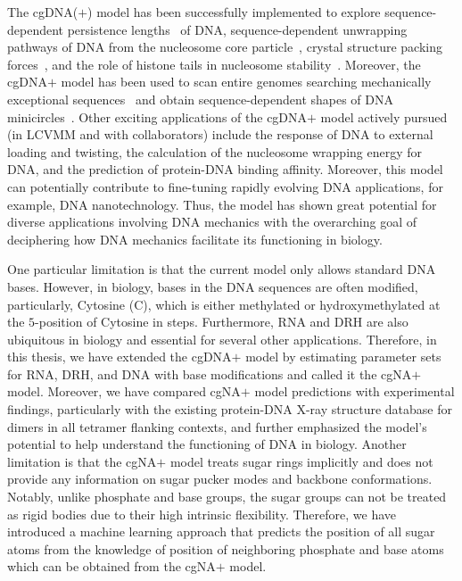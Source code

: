 The cgDNA($+$) model has been successfully implemented to explore sequence-dependent persistence lengths~\cite{cgdnamc} of DNA, sequence-dependent unwrapping pathways of DNA from the nucleosome core particle~\cite{pollack-cgDNA}, crystal structure packing forces~\cite{patelithesis}, and the role of histone tails in nucleosome stability~\cite{bendandi2020role}.
Moreover, the cgDNA$+$ model has been used to scan entire genomes searching mechanically exceptional sequences~\cite{zwahlenthesis} and obtain sequence-dependent shapes of DNA minicircles~\cite{glowackithesis,beaud2021using}. 
Other exciting applications of the cgDNA$+$ model actively pursued (in LCVMM and with collaborators) include the response of DNA to external loading and twisting, the calculation of the nucleosome wrapping energy for DNA, and the prediction of protein-DNA binding affinity.
Moreover, this model can potentially contribute to fine-tuning rapidly evolving DNA applications, for example, DNA nanotechnology.
Thus, the model has shown great potential for diverse applications involving DNA mechanics with the overarching goal of deciphering how DNA mechanics facilitate its functioning in biology.

One particular limitation is that the current model only allows standard DNA bases.
However, in biology, bases in the DNA sequences are often modified, particularly, Cytosine (C), which is either methylated or hydroxymethylated at the $5$-position of Cytosine in \cpg steps.
Furthermore, RNA and DRH are also ubiquitous in biology and essential for several other applications.
Therefore, in this thesis, we have extended the cgDNA$+$ model by estimating parameter sets for RNA, DRH, and DNA with base modifications and called it the cgNA$+$ model.
Moreover, we have compared cgNA$+$ model predictions with experimental findings, particularly with the existing protein-DNA X-ray structure database for dimers in all tetramer flanking contexts, and further emphasized the model's potential to help understand the functioning of DNA in biology.
Another limitation is that the cgNA$+$ model treats sugar rings implicitly and does not provide any information on sugar pucker modes and backbone conformations. 
Notably, unlike phosphate and base groups, the sugar groups can not be treated as rigid bodies due to their high intrinsic flexibility.
Therefore, we have introduced a machine learning approach that predicts the position of all sugar atoms from the knowledge of position of neighboring phosphate and base atoms which can be obtained from the cgNA$+$ model.

